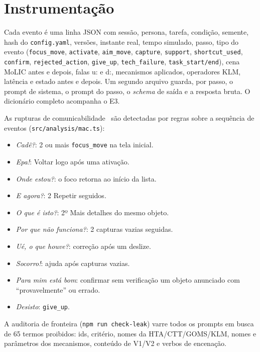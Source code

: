 \documentclass[conference]{IEEEtran}
\begin{document}
\section{Instrumentação}
Cada evento é uma linha JSON com sessão, persona, tarefa, condição, semente, hash do \texttt{config.yaml}, versões, instante real, tempo simulado, passo, tipo do evento (\texttt{focus\_move}, \texttt{activate}, \texttt{aim\_move}, \texttt{capture}, \texttt{support}, \texttt{shortcut\_used}, \texttt{confirm}, \texttt{rejected\_action}, \texttt{give\_up}, \texttt{tech\_failure}, \texttt{task\_start/end}), cena MoLIC antes e depois, falas u: e d:, mecanismos aplicados, operadores KLM, latência e estado antes e depois. Um segundo arquivo guarda, por passo, o prompt de sistema, o prompt do passo, o \emph{schema} de saída e a resposta bruta. O dicionário completo acompanha o E3.

As rupturas de comunicabilidade~\cite{desouza} são detectadas por regras sobre a sequência de eventos (\texttt{src/analysis/mac.ts}):
\begin{itemize}
\item \emph{Cadê?}: 2 ou mais \texttt{focus\_move} na tela inicial.
\item \emph{Epa!}: Voltar logo após uma ativação.
\item \emph{Onde estou?}: o foco retorna ao início da lista.
\item \emph{E agora?}: 2 Repetir seguidos.
\item \emph{O que é isto?}: 2º Mais detalhes do mesmo objeto.
\item \emph{Por que não funciona?}: 2 capturas vazias seguidas.
\item \emph{Ué, o que houve?}: correção após um deslize.
\item \emph{Socorro!}: ajuda após capturas vazias.
\item \emph{Para mim está bom}: confirmar sem verificação um objeto anunciado com ``provavelmente'' ou errado.
\item \emph{Desisto}: \texttt{give\_up}.
\end{itemize}
A auditoria de fronteira (\texttt{npm run check-leak}) varre todos os prompts em busca de 65 termos proibidos: ids, critério, nomes da HTA/CTT/GOMS/KLM, nomes e parâmetros dos mecanismos, conteúdo de V1/V2 e verbos de encenação.
\end{document}
